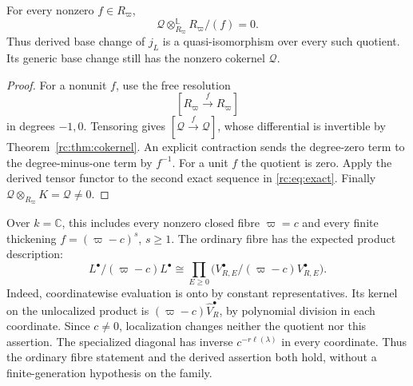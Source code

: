 \begin{proposition}
\label{rc:prop:fibres}
For every nonzero \(f\in R_\varpi\),
\begin{equation}\label{rc:eq:derived-fibre}
 \mathcal Q\otimes^{\mathbb L}_{R_\varpi}
                    R_\varpi/(f)=0.
\end{equation}
Thus derived base change of \(j_L\) is a quasi-isomorphism over
every such quotient.  Its generic base change still has the
nonzero cokernel \(\mathcal Q\).
\end{proposition}
\begin{proof}
For a nonunit \(f\), use the free resolution
\[
 [R_\varpi\xrightarrow{\ f\ }R_\varpi]
\]
in degrees \(-1,0\).  Tensoring gives
\([\mathcal Q\xrightarrow{f}\mathcal Q]\), whose differential
is invertible by Theorem~\ref{rc:thm:cokernel}.  An explicit
contraction sends the degree-zero term to the degree-minus-one
term by \(f^{-1}\).  For a unit \(f\) the quotient is zero.
Apply the derived tensor functor to the second exact sequence
in \eqref{rc:eq:exact}.  Finally
\(\mathcal Q\otimes_{R_\varpi}K=\mathcal Q\ne0\).
\end{proof}

Over \(k=\mathbb C\), this includes every nonzero closed fibre
\(\varpi=c\) and every finite thickening
\(f=(\varpi-c)^s\), \(s\geq1\).
The ordinary fibre has the expected product description:
\begin{equation}\label{rc:eq:ordinary-fibre}
 L^\bullet/(\varpi-c)L^\bullet
 \cong\prod_{E\geq0}
       \bigl(V_{R,E}^\bullet/(\varpi-c)V_{R,E}^\bullet\bigr).
\end{equation}
Indeed, coordinatewise evaluation is onto by constant
representatives.  Its kernel on the unlocalized product is
\((\varpi-c)\widehat V_R^\bullet\), by polynomial division
in each coordinate.  Since \(c\ne0\), localization changes
neither the quotient nor this assertion.  The specialized
diagonal has inverse \(c^{-r\ell(\lambda)}\) in every coordinate.
Thus the ordinary fibre statement and the derived assertion
both hold, without a finite-generation hypothesis on the family.

